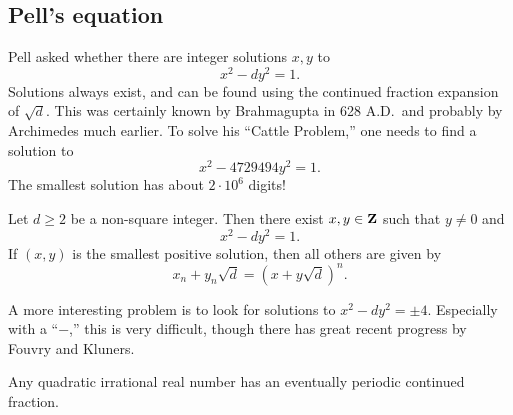 \subsection{Pell's equation}

Pell asked whether there are integer solutions $x,y$ to 
\[
  x^2 - d y^2 = 1 .
\]
Solutions always exist, and can be found using the continued fraction expansion 
of $\sqrt d$. This was certainly known by Brahmagupta in 628 A.D.~and probably 
by Archimedes much earlier. To solve his ``Cattle Problem,'' one needs to find 
a solution to 
\[
  x^2 - 4729494 y^2 = 1.
\]
The smallest solution has about $2\cdot 10^6$ digits! 


\begin{theo}
Let $d\geqslant 2$ be a non-square integer. Then there exist 
$x,y\in \mathbf{Z}$ such that $y\ne 0$ and 
\[
  x^2 - d y^2 = 1. 
\]
If $(x,y)$ is the smallest positive solution, then all others are given by 
\[
  x_n + y_n \sqrt d = (x+y\sqrt d)^n .
\]
\end{theo}

A more interesting problem is to look for solutions to 
$x^2-d y^2 = \pm 4$. Especially with a ``$-$,'' this is very difficult, though 
there has great recent progress by Fouvry and Kluners. 

\begin{theo}
Any quadratic irrational real number has an eventually periodic continued 
fraction. 
\end{theo}

